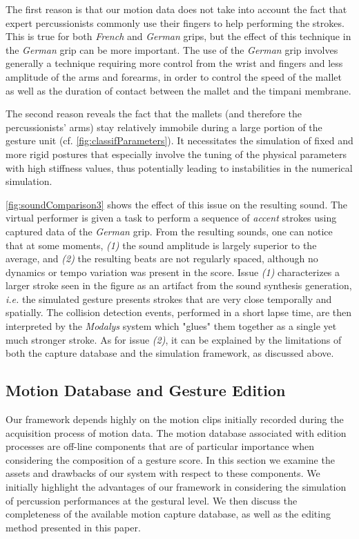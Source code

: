 The first reason is that our motion data does not take into account the fact that expert percussionists commonly use their fingers to help performing the strokes. This is true for both \emph{French} and \emph{German} grips, but the effect of this technique in the \emph{German} grip can be more important. The use of the \emph{German} grip involves generally a technique requiring more control from the wrist and fingers and less amplitude of the arms and forearms, in order to control the speed of the mallet as well as the duration of contact between the mallet and the timpani membrane.

The second reason reveals the fact that the mallets (and therefore the percussionists' arms) stay relatively immobile during a large portion of the gesture unit (cf. \myfigname \ref{fig:classifParameters}). It necessitates the simulation of fixed and more rigid postures that especially involve the tuning of the physical parameters with high stiffness values, thus potentially leading to instabilities in the numerical simulation. 
		
\myfigname \ref{fig:soundComparison3} shows the effect of this issue on the resulting sound. The virtual performer is given a task to perform a sequence of \emph{accent} strokes using captured data of the \emph{German} grip. From the resulting sounds, one can notice that at some moments, {\it (1)} the sound amplitude is largely superior to the average, and {\it (2)} the resulting beats are not regularly spaced, although no dynamics or tempo variation was present in the score. Issue {\it (1)} characterizes a larger stroke seen in the figure as an artifact from the sound synthesis generation, \emph{i.e.} the simulated gesture presents strokes that are very close temporally and spatially. The collision detection events, performed in a short lapse time, are then interpreted by the \emph{Modalys} system which "glues" them together as a single yet much stronger stroke. As for issue {\it (2)}, it can be explained by the limitations of both the capture database and the simulation framework, as discussed above. 


		\subsection{Motion Database and Gesture Edition}

Our framework depends highly on the motion clips initially recorded during the acquisition process of motion data. The motion database associated with edition processes are off-line components that are of particular importance when considering the composition of a gesture score. In this section we examine the assets and drawbacks of our system with respect to these components. We initially highlight the advantages of our framework in considering the simulation of percussion performances at the gestural level. We then discuss the completeness of the available motion capture database, as well as the editing method presented in this paper.


